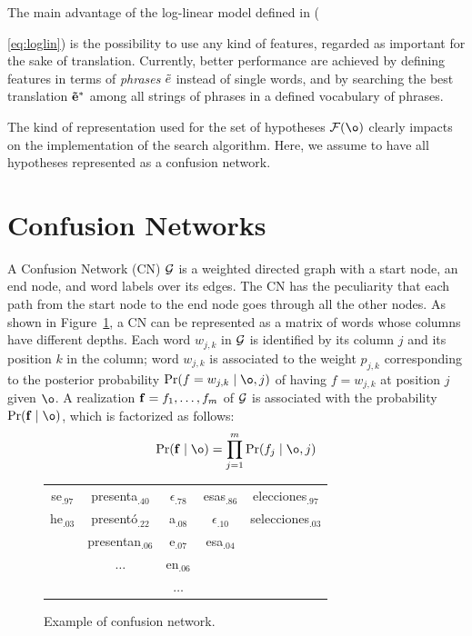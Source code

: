 \documentclass[11pt]{report}
\theoremstyle{plain}
\begin{document}
\noindent
The main advantage of the log-linear model defined in ({\ref{eq:loglin}) is
the possibility to use any kind of features, regarded as important for
the sake of translation. Currently,  better  performance  are  achieved by  defining
features  in  terms of  {\em  phrases} $\tilde{e}$  \cite{zens02,koehn03,federico05a} instead of single words, 
and by searching the best translation ${\bf \tilde{e}}^*$  among all  strings  of phrases 
in  a  defined vocabulary of phrases.

\noindent
The kind of representation used for the set of hypotheses  ${\cal F}(\o)$  clearly 
impacts on the implementation  of the search algorithm. Here, we assume to 
have all hypotheses represented as a confusion network.

\section{Confusion Networks}
\label{sec:cn}
\noindent
A Confusion Network (CN) ${\cal  G}$ is a weighted directed graph with
a start node, an end node, and word labels over its edges.  The CN has
the peculiarity  that each path  from the start  node to the  end node
goes    through    all    the    other    nodes.     As    shown    in
Figure~\ref{fig:CN-matrix}, a CN can be represented as a matrix of words
whose columns  have different depths.   Each word $w_{j,k}$  in ${\cal
G}$  is identified  by its  column  $j$ and  its position  $k$ in  the
column;  word   $w_{j,k}$  is  associated  to   the  weight  $p_{j,k}$
corresponding to the posterior probability $\Pr(f=w_{j,k} \mid \o, j)$
of  having  $f=w_{j,k}$ at  position  $j$  given  $\o$.  A realization 
${\bf f}=f_1,  \ldots, f_m$ of ${\cal G}$  is associated with
the probability $\Pr(\F\mid \o)$, which is factorized as follows:
\begin{equation}
\Pr (\F \mid \o)= \prod_{j=1}^m \Pr(f_j\mid \o, j)
\label{eq:CN-posterior}
\end{equation}

\begin{figure}
\begin{center}
\begin{tabular}{c|c|c|c|c}
se$_{.97}$ &  presenta$_{.40}$  & $\epsilon_{.78}$& esas$_{.86}$& elecciones$_{.97}$\\
he$_{.03}$ &  present\'o$_{.22}$  & a$_{.08}$           & $\epsilon_{.10}$& selecciones$_{.03}$\\
                     &  presentan$_{.06}$ & e$_{.07}$            & esa$_{.04}$&     \\
                       &  $\ldots$                    & en$_{.06}$          &                     &    \\
                      &                                    & $\ldots$                &                      &\\
\end{tabular}
\end{center}
\caption{Example of confusion network.}
\label{fig:CN-matrix}
\end{figure}


}
\end{document}
